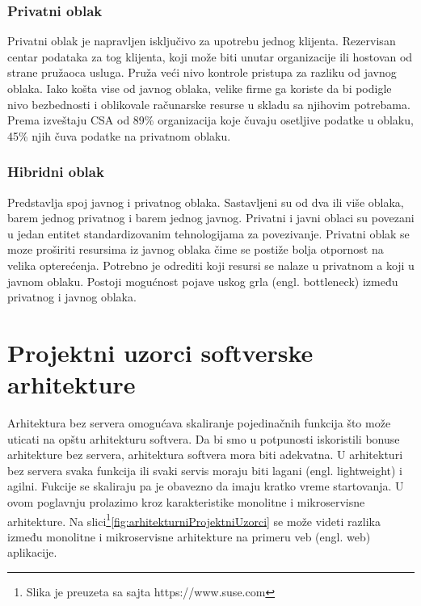 \documentclass[12pt,oneside]{memoir}
\begin{document}
 
\subsubsection{Privatni oblak}
Privatni oblak je napravljen isključivo za upotrebu jednog klijenta. Rezervisan centar podataka za tog klijenta, koji može biti unutar organizacije ili hostovan od strane pružaoca usluga. Pruža veći nivo kontrole pristupa za razliku od javnog oblaka. Iako košta vise od javnog oblaka, velike firme ga koriste da bi podigle nivo bezbednosti i oblikovale računarske resurse u skladu sa njihovim potrebama. Prema izveštaju CSA od 89\% organizacija koje čuvaju osetljive podatke u oblaku, 45\% njih čuva podatke na privatnom oblaku\cite{csa}.
 
\subsubsection{Hibridni oblak}
Predstavlja spoj javnog i privatnog oblaka. Sastavljeni su od dva ili više oblaka, barem jednog privatnog i barem jednog javnog. Privatni i javni oblaci su povezani u jedan entitet standardizovanim tehnologijama za povezivanje. Privatni oblak se moze proširiti resursima iz javnog oblaka čime se postiže bolja otpornost na velika opterećenja. Potrebno je odrediti koji resursi se nalaze u privatnom a koji u javnom oblaku. Postoji mogućnost pojave uskog grla (engl. bottleneck) između privatnog i javnog oblaka.


\section{Projektni uzorci softverske arhitekture}
Arhitektura bez servera omogućava skaliranje pojedinačnih funkcija što može uticati na opštu arhitekturu softvera. Da bi smo u potpunosti iskoristili bonuse arhitekture bez servera, arhitektura softvera mora biti adekvatna. U arhitekturi bez servera svaka funkcija ili svaki servis moraju biti lagani (engl. lightweight) i agilni. Fukcije se skaliraju pa je obavezno da imaju kratko vreme startovanja. U ovom poglavnju prolazimo kroz karakteristike monolitne i mikroservisne arhitekture. Na slici\footnote{Slika je preuzeta sa sajta https://www.suse.com}\ref{fig:arhitekturniProjektniUzorci} se može videti razlika između monolitne i mikroservisne arhitekture na primeru veb (engl. web) aplikacije.
\end{document}
